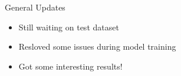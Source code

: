 \begin{frame}{General Updates}
    \begin{itemize}
        \item Still waiting on test dataset
        \item Resloved some issues during model training
        \item Got some interesting results!
    \end{itemize}    
\end{frame}






